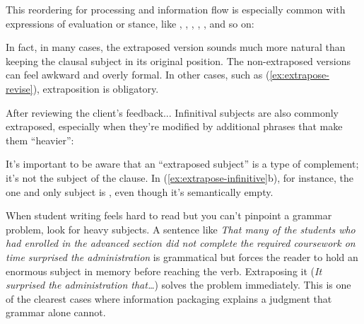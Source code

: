 This reordering for processing and information flow is especially common with expressions of evaluation or stance, like , , , , , and so on:

\ea\label{ex:extrapose-seem}
    \z
\ex\label{ex:extrapose-clear}
    \z
\z
In fact, in many cases, the extraposed version sounds much more natural than keeping the clausal subject in its original position. The non-extraposed versions can feel awkward and overly formal. In other cases, such as (\ref{ex:extrapose-revise}), extraposition is obligatory.

\ea\label{ex:extrapose-revise}
    After reviewing the client's feedback...
    \z
\z
Infinitival subjects are also commonly extraposed, especially when they're modified by additional phrases that make them \enquote{heavier}:

\ea\label{ex:extrapose-infinitive}
    \z
\z
It's important to be aware that an \enquote{extraposed subject} is a type of complement; it's not the subject of the clause. In (\ref{ex:extrapose-infinitive}b), for instance, the one and only subject is , even though it's semantically empty.

When student writing feels hard to read but you can't pinpoint a grammar problem, look for heavy subjects. A sentence like \emph{That many of the students who had enrolled in the advanced section did not complete the required coursework on time surprised the administration} is grammatical but forces the reader to hold an enormous subject in memory before reaching the verb. Extraposing it (\emph{It surprised the administration that\ldots}) solves the problem immediately. This is one of the clearest cases where information packaging explains a judgment that grammar alone cannot.

